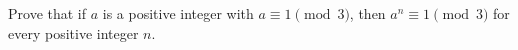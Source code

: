 Prove that if $a$ is a positive integer with $a\equiv 1\pmod 3$, then $a^n\equiv 1\pmod 3$ for every positive integer $n$.
